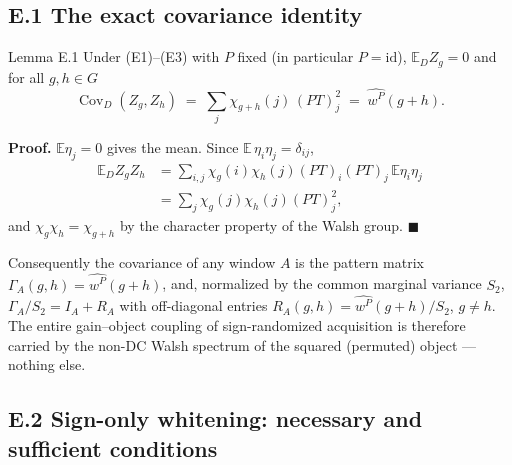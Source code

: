 \subsection{E.1 The exact covariance identity}

\begin{namedthm}{Lemma E.1}
Under (E1)--(E3) with $P$ fixed (in particular $P=\mathrm{id}$), $\mathbb{E}_D Z_g=0$ and for all $g,h\in G$
\begin{equation}
\operatorname{Cov}_D(Z_g,Z_h)\;=\;\sum_j \chi_{g+h}(j)\,(PT)_j^2\;=\;\widehat{w^P}(g+h). \tag{E.1}
\end{equation}
\end{namedthm}

\noindent\textbf{Proof.} $\mathbb{E}\eta_j=0$ gives the mean. Since $\mathbb{E}\,\eta_i\eta_j=\delta_{ij}$,
\[
\begin{aligned}
\mathbb{E}_D Z_gZ_h&=\sum_{i,j}\chi_g(i)\chi_h(j)(PT)_i(PT)_j\,\mathbb{E}\eta_i\eta_j\\
&=\sum_j \chi_g(j)\chi_h(j)(PT)_j^2,
\end{aligned}
\]
and $\chi_g\chi_h=\chi_{g+h}$ by the character property of the Walsh group. \hfill$\blacksquare$

Consequently the covariance of any window $A$ is the pattern matrix $\Gamma_A(g,h)=\widehat{w^P}(g+h)$, and, normalized by the common marginal variance $S_2$, $\Gamma_A/S_2=I_A+R_A$ with off-diagonal entries $R_A(g,h)=\widehat{w^P}(g+h)/S_2$, $g\neq h$. The entire gain--object coupling of sign-randomized acquisition is therefore carried by the non-DC Walsh spectrum of the squared (permuted) object --- nothing else.

\subsection{E.2 Sign-only whitening: necessary and sufficient conditions}


